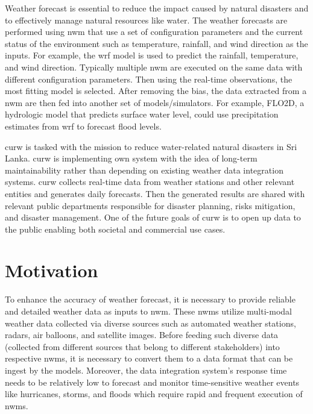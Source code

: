 Weather forecast is essential to reduce the impact caused by natural disasters and to effectively manage natural resources like water.
The weather forecasts are performed using \acrfull{nwm} that use a set of configuration parameters and the current status of the environment such as temperature, rainfall, and wind direction as the inputs. For example, the \acrfull{wrf} \cite{MesoscaleMicroscaleMeteorologyLaboratoryWeatherModel} model is used to predict the rainfall, temperature, and wind direction. Typically multiple \acrshort{nwm} are executed on the same data with different configuration parameters. Then using the real-time observations, the most fitting model is selected. After removing the bias, the data extracted from a \acrshort{nwm} are then fed into another set of models/simulators. For example, FLO2D, a hydrologic model that predicts surface water level, could use precipitation estimates from \acrshort{wrf} to forecast flood levels.

\acrfull{curw} \cite{CUrWSL2017Lanka} is tasked with the mission to reduce water-related natural disasters in Sri Lanka. \acrshort{curw} \cite{CUrWSLObservedSL} is implementing own system with the idea of long-term maintainability rather than depending on existing weather data integration systems.  \acrshort{curw} collects real-time data from weather stations and other relevant entities and generates daily forecasts. Then the generated results are shared with relevant public departments responsible for disaster planning, risks mitigation, and disaster management. One of the future goals of \acrshort{curw} is to open up data to the public enabling both societal and commercial use cases.

\section{Motivation}
To enhance the accuracy of weather forecast, it is necessary to provide reliable and detailed weather data as inputs to \acrshort{nwm}. These \acrshort{nwm}s utilize multi-modal weather data collected via diverse sources such as automated weather stations, radars, air balloons, and satellite images. Before feeding such diverse data (collected from different sources that belong to different stakeholders) into respective \acrshort{nwm}s, it is necessary to convert them to a data format that can be ingest by the models. Moreover, the data integration system's response time needs to be relatively low to forecast and monitor time-sensitive weather events like hurricanes, storms, and floods which require rapid and frequent execution of \acrshort{nwm}s.

